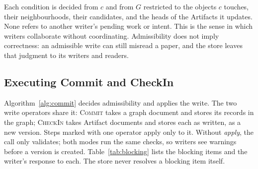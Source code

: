\documentclass[sigconf,review,anonymous]{acmart}
\begin{document}
Each condition is decided from $c$ and from $G$ restricted to the objects $c$
touches, their neighbourhoods, their candidates, and the heads of the Artifacts
it updates. None refers to another writer's pending work or intent. This is the
sense in which writers collaborate without coordinating. Admissibility does
not imply correctness: an admissible write can still misread a paper, and the
store leaves that judgment to its writers and readers.

\subsection{Executing Commit and CheckIn}
\label{sec:commit-draft}

Algorithm~\ref{alg:commit} decides admissibility and applies the write. The two
write operators share it: \textsc{Commit} takes a graph document and stores its
records in the graph; \textsc{CheckIn} takes Artifact documents and stores each
as written, as a new version. Steps marked with one operator apply only to it.
Without \textit{apply}, the call only validates; both modes run the same
checks, so writers see warnings before a version is created.
Table~\ref{tab:blocking} lists the blocking items and the writer's response to
each. The store never resolves a blocking item itself.
\end{document}
